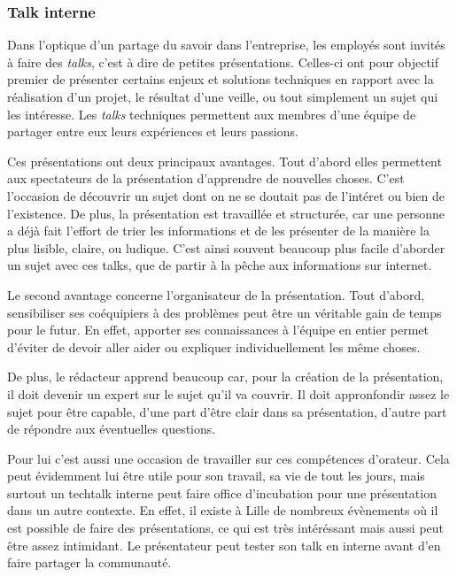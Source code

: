 \documentclass[12pt,a4paper]{article}
\begin{document}
  \bigskip

  \subsubsection{Talk interne}\label{talk-interne}

  \bigskip

  Dans l'optique d'un partage du savoir dans l'entreprise, les employés
  sont invités à faire des \emph{talks}, c'est à dire de petites
  présentations. Celles-ci ont pour objectif premier de présenter certains
  enjeux et solutions techniques en rapport avec la réalisation d'un
  projet, le résultat d'une veille, ou tout simplement un sujet qui les
  intéresse. Les \emph{talks} techniques permettent aux membres d'une
  équipe de partager entre eux leurs expériences et leurs passions.

  \bigskip

  Ces présentations ont deux principaux avantages. Tout d'abord elles
  permettent aux spectateurs de la présentation d'apprendre de nouvelles
  choses. C'est l'occasion de découvrir un sujet dont on ne se doutait pas
  de l'intéret ou bien de l'existence. De plus, la présentation est
  travaillée et structurée, car une personne a déjà fait l'effort de trier
  les informations et de les présenter de la manière la plus lisible,
  claire, ou ludique. C'est ainsi souvent beaucoup plus facile d'aborder
  un sujet avec ces talks, que de partir à la pêche aux informations sur
  internet.

  \bigskip

  Le second avantage concerne l'organisateur de la présentation. Tout
  d'abord, sensibiliser ses coéquipiers à des problèmes peut être un
  véritable gain de temps pour le futur. En effet, apporter ses
  connaissances à l'équipe en entier permet d'éviter de devoir aller aider
  ou expliquer individuellement les même choses.

  \bigskip

  De plus, le rédacteur apprend beaucoup car, pour la création de la
  présentation, il doit devenir un expert sur le sujet qu'il va couvrir.
  Il doit appronfondir assez le sujet pour être capable, d'une part d'être
  clair dans sa présentation, d'autre part de répondre aux éventuelles
  questions.

  \bigskip

  Pour lui c'est aussi une occasion de travailler sur ces compétences
  d'orateur. Cela peut évidemment lui être utile pour son travail, sa vie
  de tout les jours, mais surtout un techtalk interne peut faire office
  d'incubation pour une présentation dans un autre contexte. En effet, il
  existe à Lille de nombreux évènements où il est possible de faire des
  présentations, ce qui est très intéréssant mais aussi peut être assez
  intimidant. Le présentateur peut tester son talk en interne avant d'en
  faire partager la communauté.
\end{document}
